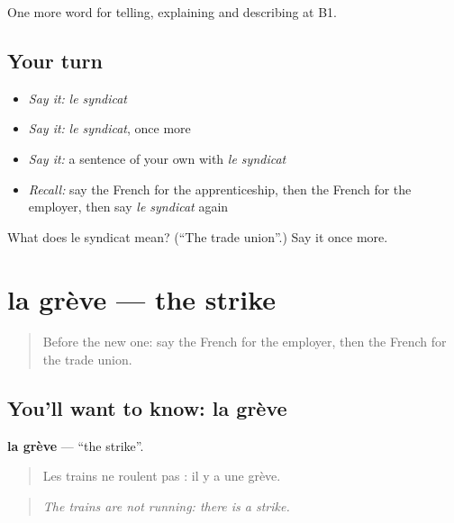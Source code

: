 \begin{grammarlens}[title={What you've built}]
One more word for telling, explaining and describing at B1.
\end{grammarlens}

\subsection*{Your turn}
\begin{itemize}
\raggedright
  \item \emph{Say it:} \emph{le syndicat}
  \item \emph{Say it:} \emph{le syndicat}, once more
  \item \emph{Say it:} a sentence of your own with \emph{le syndicat}
  \item \emph{Recall:} say the French for the apprenticeship, then the French for the employer, then say \emph{le syndicat} again
\end{itemize}

\begin{tcolorbox}[breakable,colback=teal!4,colframe=teal!35!black,title={Before you move on}]
What does le syndicat mean? (\textquotedblleft{}The trade union\textquotedblright{}.) Say it once more.
\end{tcolorbox}
\section[la grève]{la grève — the strike}

\label{lesson:FR-C358-greve}



\begin{quote}
Before the new one: say the French for the employer, then the French for the trade union.
\end{quote}

\subsection*{You'll want to know: la grève}
\textbf{la grève} — \textquotedblleft{}the strike\textquotedblright{}.

\begin{quote}
Les trains ne roulent pas : il y a une grève.
\end{quote}

\begin{quote}
\emph{The trains are not running: there is a strike.}
\end{quote}

